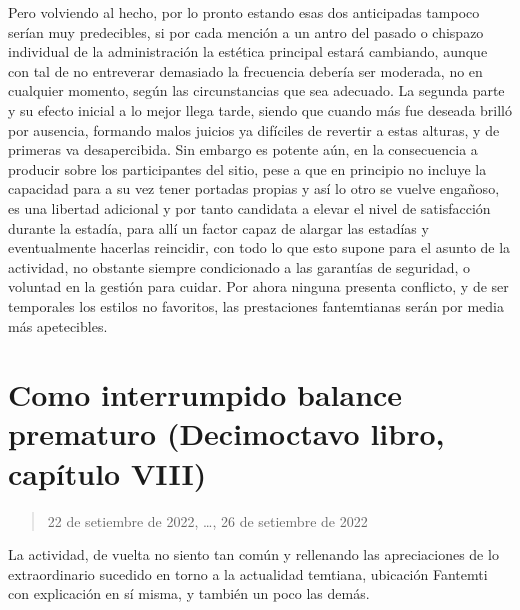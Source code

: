 \documentclass[
]{book}
\begin{document}
Pero volviendo al hecho, por lo pronto estando esas dos anticipadas tampoco serían muy predecibles, si por cada mención a un antro del pasado o chispazo individual de la administración la estética principal estará cambiando, aunque con tal de no entreverar demasiado la frecuencia debería ser moderada, no en cualquier momento, según las circunstancias que sea adecuado. La segunda parte y su efecto inicial a lo mejor llega tarde, siendo que cuando más fue deseada brilló por ausencia, formando malos juicios ya difíciles de revertir a estas alturas, y de primeras va desapercibida. Sin embargo es potente aún, en la consecuencia a producir sobre los participantes del sitio, pese a que en principio no incluye la capacidad para a su vez tener portadas propias y así lo otro se vuelve engañoso, es una libertad adicional y por tanto candidata a elevar el nivel de satisfacción durante la estadía, para allí un factor capaz de alargar las estadías y eventualmente hacerlas reincidir, con todo lo que esto supone para el asunto de la actividad, no obstante siempre condicionado a las garantías de seguridad, o voluntad en la gestión para cuidar. Por ahora ninguna presenta conflicto, y de ser temporales los estilos no favoritos, las prestaciones fantemtianas serán por media más apetecibles.

\hypertarget{como-interrumpido-balance-prematuro-decimoctavo-libro-capuxedtulo-viii}{%
\section{Como interrumpido balance prematuro (Decimoctavo libro, capítulo VIII)}\label{como-interrumpido-balance-prematuro-decimoctavo-libro-capuxedtulo-viii}}

\begin{quote}
22 de setiembre de 2022, \ldots, 26 de setiembre de 2022
\end{quote}

La actividad, de vuelta no siento tan común y rellenando las apreciaciones de lo extraordinario sucedido en torno a la actualidad temtiana, ubicación Fantemti con explicación en sí misma, y también un poco las demás.
\end{document}

